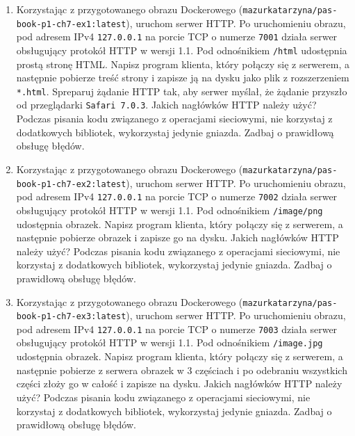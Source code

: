 \documentclass{article}
\begin{document}
\begin{enumerate}[label=\textbf{7.\arabic*}]\setlength{\itemsep}{1em}

\item Korzystając z przygotowanego obrazu Dockerowego (\texttt{mazurkatarzyna/pas-book-p1-ch7-ex1:latest}), uruchom serwer HTTP. Po uruchomieniu obrazu, pod adresem IPv4 \texttt{127.0.0.1} na porcie TCP o numerze \texttt{7001} działa serwer obsługujący protokół HTTP w wersji 1.1. Pod odnośnikiem \texttt{/html} udostępnia prostą stronę HTML. Napisz program klienta, który połączy się
z serwerem, a następnie pobierze treść strony i zapisze ją na dysku jako plik z rozszerzeniem \texttt{*.html}. Spreparuj żądanie HTTP tak, aby serwer myślał, że żądanie przyszło od przeglądarki \texttt{Safari 7.0.3}. Jakich nagłówków HTTP należy użyć?  Podczas pisania kodu związanego z operacjami sieciowymi, nie korzystaj z dodatkowych bibliotek, wykorzystaj jedynie gniazda. Zadbaj o prawidłową obsługę błędów.

\item Korzystając z przygotowanego obrazu Dockerowego (\texttt{mazurkatarzyna/pas-book-p1-ch7-ex2:latest}), uruchom serwer HTTP. Po uruchomieniu obrazu, pod adresem IPv4 \texttt{127.0.0.1} na porcie TCP o numerze \texttt{7002} działa serwer obsługujący protokół HTTP w wersji 1.1. Pod odnośnikiem \texttt{/image/png} udostępnia obrazek. Napisz program klienta, który połączy się
z serwerem, a następnie pobierze obrazek i zapisze go na dysku. Jakich nagłówków HTTP należy użyć? Podczas pisania kodu związanego z operacjami sieciowymi, nie korzystaj z dodatkowych bibliotek, wykorzystaj jedynie gniazda. Zadbaj o prawidłową obsługę błędów.

\item Korzystając z przygotowanego obrazu Dockerowego (\texttt{mazurkatarzyna/pas-book-p1-ch7-ex3:latest}), uruchom serwer HTTP.  Po uruchomieniu obrazu, pod adresem IPv4 \texttt{127.0.0.1} na porcie TCP o numerze \texttt{7003} działa serwer obsługujący protokół HTTP w wersji 1.1. Pod odnośnikiem \texttt{/image.jpg} udostępnia obrazek. Napisz program klienta, który połączy się
z serwerem, a następnie pobierze z serwera obrazek w 3 częściach i po odebraniu wszystkich części złoży go w całość i zapisze na dysku. Jakich nagłówków HTTP należy użyć? Podczas pisania kodu związanego z operacjami sieciowymi, nie korzystaj z dodatkowych bibliotek, wykorzystaj jedynie gniazda. Zadbaj o prawidłową obsługę błędów.


\end{enumerate}
\end{document}
